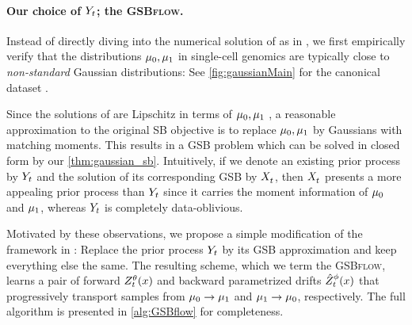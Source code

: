 \paragraph{Our choice of $Y_{ t }$; the \textsc{GSBflow}.}

Instead of directly diving into the numerical solution of  as in \citet{chen2021likelihood}, we first empirically verify that the distributions $\mu_0,\mu_1$ in single-cell genomics are typically close to \emph{non-standard} Gaussian distributions: See \cref{fig:gaussianMain} for the canonical dataset \citep{schiebinger2019optimal}. 

Since the solutions of  are Lipschitz in terms of $\mu_0,\mu_1$ \citep{carlier2022lipschitz}, a reasonable approximation to the original \acrshort{SB} objective is to replace $\mu_0,\mu_1$ by Gaussians with matching moments. This results in a \acrshort{GSB} problem which can be solved in closed form by our \cref{thm:gaussian_sb}. Intuitively, if we denote an existing prior process by $Y_{ t }$ and the solution of its corresponding \acrshort{GSB} by $X^{}_{ t }$, then $X^{}_{ t }$ presents a more appealing prior process than $Y_{ t }$ since it carries the moment information of $\mu_0$ and $\mu_1$, whereas $Y_{ t }$ is completely data-oblivious.

Motivated by these observations, we propose a simple modification of the framework in \citet{chen2021likelihood}: Replace the prior process $Y_{ t }$ by its \acrshort{GSB} approximation and keep everything else the same. The resulting scheme, which we term the \textsc{GSBflow}, learns a pair of forward {\color{pink} $\SBf$} and backward parametrized drifts {\color{blue} $\SBb$} that progressively transport samples from $\mu_0 \rightarrow \mu_1$ and $\mu_1 \rightarrow \mu_0$, respectively. The full algorithm is presented in \cref{alg:GSBflow} for completeness.

